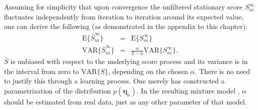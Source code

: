 Assuming for simplicity that upon convergence the unfiltered stationary score
$S_{ni}^{\infty}$ fluctuates independently from iteration to
iteration around its expected value, one can derive the following 
(as demonstrated in the appendix to this chapter):
\begin{eqnarray}
\text{E}\{\bar{S}_{ni}^{\infty}\} & = & \text{E}\{S_{ni}^{\infty}\}\\
\text{VAR}\{\bar{S}_{ni}^{\infty}\} & = & \frac{\alpha}{2-\alpha}\text{VAR}\{S_{ni}^{\infty}\}.
\end{eqnarray}
$\bar{S}$ is unbiased with respect to the underlying score process
and its variance is in the interval from zero to $\text{VAR}\{S\}$,
depending on the chosen $\alpha$. There is no need to justify this
through a learning process. One merely has constructed a parametrization
of the distribution $p(\boldsymbol{\eta}_n)$. In the resulting
mixture model , $\alpha$ should be
estimated from real data, just as any other parameter of that model.
%





